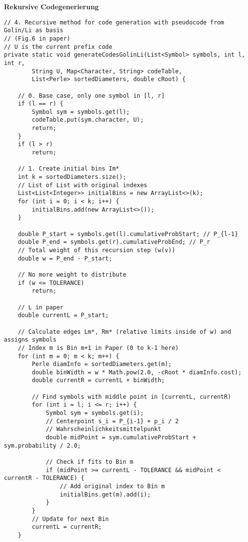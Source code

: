 \documentclass[a4paper,10pt,ngerman]{scrartcl}
\begin{document}
\textbf{Rekursive Codegenerierung}
\begin{lstlisting}
// 4. Recursive method for code generation with pseudocode from Golin/Li as basis
// (Fig.6 in paper)
// U is the current prefix code
private static void generateCodesGolinLi(List<Symbol> symbols, int l, int r,
        String U, Map<Character, String> codeTable,
        List<Perle> sortedDiameters, double cRoot) {

    // 0. Base case, only one symbol in [l, r]
    if (l == r) {
        Symbol sym = symbols.get(l);
        codeTable.put(sym.character, U);
        return;
    }
    if (l > r)
        return;

    // 1. Create initial bins Im*
    int k = sortedDiameters.size();
    // List of List with original indexes
    List<List<Integer>> initialBins = new ArrayList<>(k);
    for (int i = 0; i < k; i++) {
        initialBins.add(new ArrayList<>());
    }

    double P_start = symbols.get(l).cumulativeProbStart; // P_{l-1}
    double P_end = symbols.get(r).cumulativeProbEnd; // P_r
    // Total weight of this recursion step (w(v))
    double w = P_end - P_start;

    // No more weight to distribute
    if (w <= TOLERANCE)
        return;

    // L in paper
    double currentL = P_start;

    // Calculate edges Lm*, Rm* (relative limits inside of w) and assigns symbols
    // Index m is Bin m+1 in Paper (0 to k-1 here)
    for (int m = 0; m < k; m++) {
        Perle diamInfo = sortedDiameters.get(m);
        double binWidth = w * Math.pow(2.0, -cRoot * diamInfo.cost);
        double currentR = currentL + binWidth;

        // Find symbols with middle point in [currentL, currentR)
        for (int i = l; i <= r; i++) {
            Symbol sym = symbols.get(i);
            // Centerpoint s_i = P_{i-1} + p_i / 2
            // Wahrscheinlichkeitsmittelpunkt
            double midPoint = sym.cumulativeProbStart + sym.probability / 2.0;

            // Check if fits to Bin m
            if (midPoint >= currentL - TOLERANCE && midPoint < currentR - TOLERANCE) {
                // Add original index to Bin m
                initialBins.get(m).add(i);
            }
        }
        // Update for next Bin
        currentL = currentR;
    }


\end{lstlisting}
\end{document}
